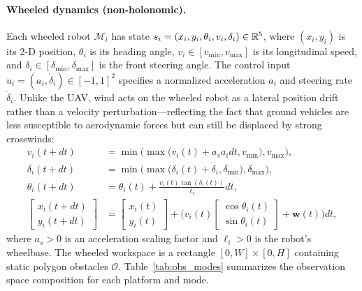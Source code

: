 \documentclass{article}
\providecommand{\obst}{\mathcal{O}}
\begin{document}
\paragraph{Wheeled dynamics (non-holonomic).}
Each wheeled robot $\mathcal{M}_i$ has state $s_i = (x_i, y_i, \theta_i, v_i, \delta_i) \in \mathbb{R}^5$, where $(x_i, y_i)$ is its 2-D position, $\theta_i$ is its heading angle, $v_i \in [v_{\min}, v_{\max}]$ is its longitudinal speed, and $\delta_i \in [\delta_{\min}, \delta_{\max}]$ is the front steering angle. The control input $u_i = (a_i, \dot{\delta}_i) \in [-1,1]^2$ specifies a normalized acceleration $a_i$ and steering rate $\dot{\delta}_i$. Unlike the UAV, wind acts on the wheeled robot as a lateral position drift rather than a velocity perturbation---reflecting the fact that ground vehicles are less susceptible to aerodynamic forces but can still be displaced by strong crosswinds:
\begin{align}
    v_i(t+dt) &= \min \big( \max \big( v_i(t) + a_s a_i dt,  v_{\min} \big),  v_{\max}\big), \label{eq:whl_vel} \\
    \delta_i(t+dt) &= \min \big( \max \big( \delta_i(t) + \dot{\delta}_i,  \delta_{\min} \big),  \delta_{\max}\big), \label{eq:whl_steer} \\
    \theta_i(t+dt) &= \theta_i(t) + \tfrac{v_i(t) \tan(\delta_i(t))}{\ell_i} dt, \label{eq:whl_head} \\
    \begin{bmatrix} x_i(t+dt) \\ y_i(t+dt) \end{bmatrix} &=
    \begin{bmatrix} x_i(t) \\ y_i(t) \end{bmatrix}
    + \Big( v_i(t) \begin{bmatrix}\cos\theta_i(t)\\\sin\theta_i(t)\end{bmatrix} + \mathbf{w}(t) \Big) dt, \label{eq:whl_pos}
\end{align}
where $a_s > 0$ is an acceleration scaling factor and $\ell_i > 0$ is the robot's wheelbase. The wheeled workspace is a rectangle $[0, W]\times[0, H]$ containing static polygon obstacles $\obst$. Table~\ref{tab:obs_modes} summarizes the observation space composition for each platform and mode.
\end{document}
